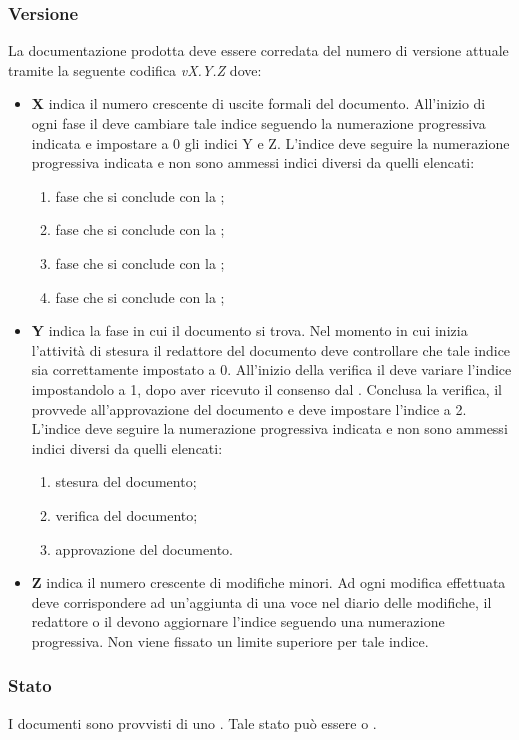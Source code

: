 \documentclass[12pt,a4paper]{article}
\begin{document}
\subsubsection{Versione} \label{Versione}
La documentazione prodotta deve essere corredata del numero di versione attuale tramite la seguente codifica \emph{vX.Y.Z} dove:
\begin{itemize}
  \item \textbf{X} indica il numero crescente di uscite formali del documento. All’inizio di ogni fase il \PM deve cambiare tale indice seguendo la numerazione progressiva indicata e impostare a 0 gli indici Y e Z. L’indice deve seguire la numerazione progressiva indicata e non sono ammessi indici diversi da quelli elencati:
  \begin{enumerate}
    \item fase che si conclude con la \RR;
    \item fase che si conclude con la \RP;
    \item fase che si conclude con la \RQ;
    \item fase che si conclude con la \RA;
  \end{enumerate}
  \item \textbf{Y} indica la fase in cui il documento si trova. Nel momento in cui inizia l’attività di stesura il redattore del documento deve controllare che tale indice sia correttamente impostato a 0. All’inizio della verifica il \VR{} deve variare l’indice impostandolo a 1, dopo aver ricevuto il consenso dal \PM. Conclusa la verifica, il \PM{} provvede all’approvazione del documento e deve impostare l’indice a 2. L’indice deve seguire la numerazione progressiva indicata e non sono ammessi indici diversi da quelli elencati:
  \begin{enumerate}[start=0]
    \item stesura del documento;
    \item verifica del documento;
    \item approvazione del documento.
  \end{enumerate}
  \item \textbf{Z} indica il numero crescente di modifiche minori. Ad ogni modifica effettuata deve corrispondere ad un’aggiunta di una voce nel diario delle modifiche, il redattore o il \VR devono aggiornare l’indice seguendo una numerazione progressiva. Non viene fissato un limite superiore per tale indice.
\end{itemize}

\subsubsection{Stato}
I documenti sono provvisti di uno . Tale stato può essere  o  .
\end{document}
